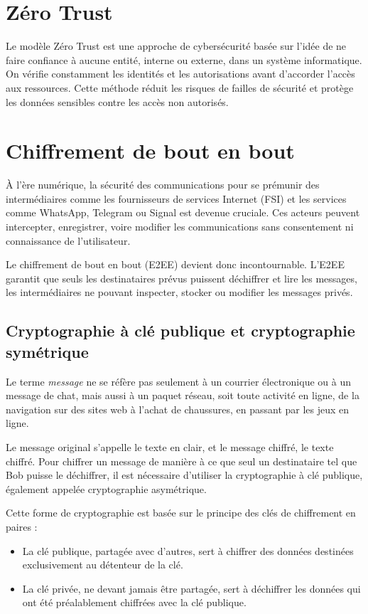 \section{Zéro Trust}
Le modèle Zéro Trust est une approche de cybersécurité basée sur l'idée de ne faire confiance à aucune entité, interne ou externe, dans un système informatique. On vérifie constamment les identités et les autorisations avant d'accorder l'accès aux ressources. Cette méthode réduit les risques de failles de sécurité et protège les données sensibles contre les accès non autorisés.

\section{Chiffrement de bout en bout}

À l'ère numérique, la sécurité des communications pour se prémunir des intermédiaires comme les fournisseurs de services Internet (FSI) et les services comme WhatsApp, Telegram ou Signal est devenue cruciale. Ces acteurs peuvent intercepter, enregistrer, voire modifier les communications sans consentement ni connaissance de l'utilisateur.

Le chiffrement de bout en bout (\gls{E2EE}) devient donc incontournable. L'\gls{E2EE} garantit que seuls les destinataires prévus puissent déchiffrer et lire les messages, les intermédiaires ne pouvant inspecter, stocker ou modifier les messages privés.

\subsection{Cryptographie à clé publique et cryptographie symétrique}

Le terme \textit{message} ne se réfère pas seulement à un courrier électronique ou à un message de chat, mais aussi à un paquet réseau, soit toute activité en ligne, de la navigation sur des sites web à l'achat de chaussures, en passant par les jeux en ligne.

Le message original s'appelle le texte en clair, et le message chiffré, le texte chiffré. Pour chiffrer un message de manière à ce que seul un destinataire tel que Bob puisse le déchiffrer, il est nécessaire d'utiliser la cryptographie à clé publique, également appelée cryptographie asymétrique.

Cette forme de cryptographie est basée sur le principe des clés de chiffrement en paires :

\begin{itemize}
    \item La clé publique, partagée avec d'autres, sert à chiffrer des données destinées exclusivement au détenteur de la clé.
    \item La clé privée, ne devant jamais être partagée, sert à déchiffrer les données qui ont été préalablement chiffrées avec la clé publique.
\end{itemize}

